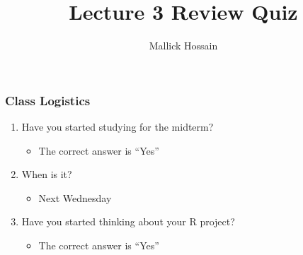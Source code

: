 \documentclass{beamer}
\title{Lecture 3 Review Quiz}
\author{Mallick Hossain}
\date{}
\institute{University of Pennsylvania}
\begin{document}
\begin{frame}
	\titlepage 
\end{frame} 

\begin{frame}
\frametitle{Class Logistics}
    \begin{enumerate}[<+- | alert@+>]
        \item Have you started studying for the midterm?
            \begin{itemize}
                \item The correct answer is ``Yes''
            \end{itemize}
       \item When is it?
       	\begin{itemize}
       		\item Next Wednesday
       	\end{itemize}
        \item Have you started thinking about your R project?
            \begin{itemize}
                \item The correct answer is ``Yes'' 
            \end{itemize}
    \end{enumerate}
\end{frame} 
\end{document}
